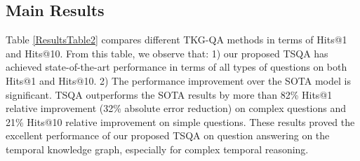 \documentclass[11pt]{article}
\begin{document}



\subsection{Main Results}
Table \ref{ResultsTable2} compares different TKG-QA methods in terms of Hits@1 and Hits@10. From this table, we observe that: 1) our proposed TSQA has achieved state-of-the-art performance in terms of all types of questions on both Hits@1 and Hits@10. 2) The performance improvement over the SOTA model is significant. TSQA outperforms the SOTA results by more than 82\% Hits@1 relative improvement (32\% absolute error reduction) on complex questions and 21\% Hits@10 relative improvement on simple questions.
These results proved the excellent performance of our proposed TSQA on question answering on the temporal knowledge graph, especially for complex temporal reasoning.
\end{document}
